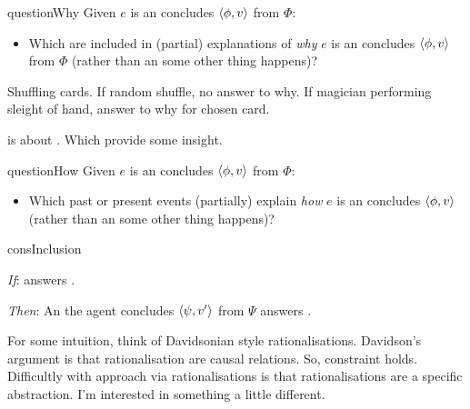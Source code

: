 \documentclass[10pt]{article}
\begin{document}
\begin{note}
  \begin{question}{questionWhy}{\qWhy{}}
    Given \(e\) is an  \vAgent{} concludes \(\langle\phi, v\rangle\) from \(\Phi\):
    \begin{itemize}
    \item
      Which  are included in (partial) explanations of \emph{why} \(e\) is an  \vAgent{} concludes \(\langle\phi, v\rangle\) from \(\Phi\) (rather than an  some other thing happens)?
    \end{itemize}
    \vspace{-1\baselineskip}
  \end{question}

  Shuffling cards.
  If random shuffle, no answer to why.
  If magician performing sleight of hand, answer to why for chosen card.

  \qWhy{} is about \fingfr{}.
  Which \fingfr{} provide some insight.
\end{note}

\begin{note}
  \begin{question}{questionHow}{\qHow{}}
    Given \(e\) is an  \vAgent{} concludes \(\langle\phi, v\rangle\) from \(\Phi\):
    \begin{itemize}
    \item
      Which past or present events (partially) explain \emph{how} \(e\) is an  \vAgent{} concludes \(\langle\phi, v\rangle\) (rather than an  some other thing happens)?
    \end{itemize}
    \vspace{-1.5\baselineskip}
  \end{question}
\end{note}


\begin{note}
  \begin{constraint}{consInclusion}{\issueInclusion{}}
    \mbox{ }
    \vspace{-\baselineskip}
    \begin{itenum}
    \item[\emph{If}:]
       answers \qWhy{}.
    \item[\emph{Then}:]
      An  the agent concludes \(\langle\psi, v'\rangle\) from \(\Psi\) answers \qHow{}.
    \end{itenum}
    \vspace{-\baselineskip}
  \end{constraint}

  For some intuition, think of Davidsonian style rationalisations.
  Davidson's argument is that rationalisation are causal relations.
  So, constraint holds.
  Difficultly with approach via rationalisations is that rationalisations are a specific abstraction.
  I'm interested in something a little different.
\end{note}
\end{document}
